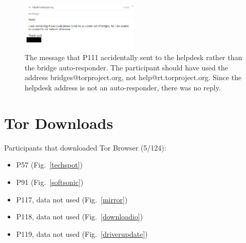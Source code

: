 \documentclass[USenglish,oneside,twocolumn]{article}
\begin{document}
\begin{figure}[h]
\includegraphics[width=0.5\textwidth]{../experiment/processing/failed-participants/20160328-133857-bridgeresponder-redacted.png}
\caption{The message that P111 accidentally sent to the helpdesk rather than the bridge auto-responder. The participant should have used the address bridges@torproject.org, not help@rt.torproject.org. Since the helpdesk address is not an auto-responder, there was no reply.}
\label{autoresponder2}
\end{figure} 

\section{Tor Downloads}
\label{tor-downloads}

Participants that downloaded Tor Browser (5/124): 
\begin{itemize}
\item P57 (Fig.~\ref{techspot})
\item P91 (Fig.~\ref{softsonic})
\item P117, data not used (Fig.~\ref{mirror})
\item P118, data not used (Fig.~\ref{downloadio})
\item P119, data not used (Fig.~\ref{driverupdate})
\end{itemize} 

\end{document}
